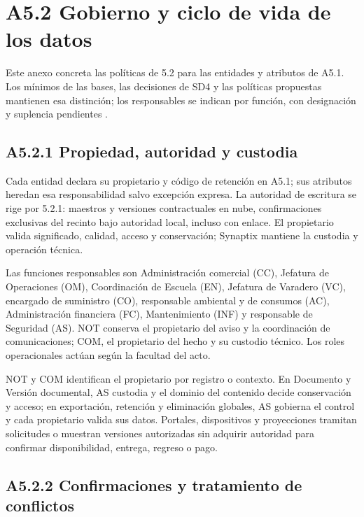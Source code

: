 \section*{A5.2 Gobierno y ciclo de vida de los datos}

\label{anx:sd5_gobierno_ciclo_vida}

Este anexo concreta las políticas de 5.2 para las entidades y atributos de A5.1. Los mínimos de las bases, las decisiones de SD4 y las políticas propuestas mantienen esa distinción; los responsables se indican por función, con designación y suplencia pendientes \parencites[RT-05.01--RT-05.10]{pucv-bases-transversales}{synaptix-sd4}.

\subsection*{A5.2.1 Propiedad, autoridad y custodia}

Cada entidad declara su propietario y código de retención en A5.1; sus atributos heredan esa responsabilidad salvo excepción expresa. La autoridad de escritura se rige por 5.2.1: maestros y versiones contractuales en nube, confirmaciones exclusivas del recinto bajo autoridad local, incluso con enlace. El propietario valida significado, calidad, acceso y conservación; Synaptix mantiene la custodia y operación técnica.

Las funciones responsables son Administración comercial (CC), Jefatura de Operaciones (OM), Coordinación de Escuela (EN), Jefatura de Varadero (VC), encargado de suministro (CO), responsable ambiental y de consumos (AC), Administración financiera (FC), Mantenimiento (INF) y responsable de Seguridad (AS). NOT conserva el propietario del aviso y la coordinación de comunicaciones; COM, el propietario del hecho y su custodio técnico. Los roles operacionales actúan según la facultad del acto.

NOT y COM identifican el propietario por registro o contexto. En Documento y Versión documental, AS custodia y el dominio del contenido decide conservación y acceso; en exportación, retención y eliminación globales, AS gobierna el control y cada propietario valida sus datos. Portales, dispositivos y proyecciones tramitan solicitudes o muestran versiones autorizadas sin adquirir autoridad para confirmar disponibilidad, entrega, regreso o pago.

\subsection*{A5.2.2 Confirmaciones y tratamiento de conflictos}

